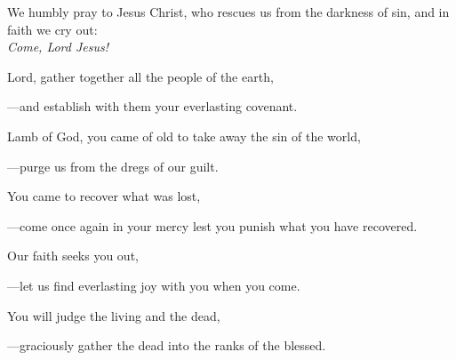 \intercessions\indent

\begin{hangpar}

We humbly pray to Jesus Christ, who rescues us from the darkness of sin, and in faith we cry out:\\
\emph{Come, Lord Jesus!}

\medskip Lord, gather together all the people of the earth,

{\color{red}---\thinspace}and establish with them your everlasting covenant.

\medskip Lamb of God, you came of old to take away the sin of the world,

{\color{red}---\thinspace}purge us from the dregs of our guilt.

\medskip You came to recover what was lost,

{\color{red}---\thinspace}come once again in your mercy lest you punish what you have recovered.

\medskip Our faith seeks you out,

{\color{red}---\thinspace}let us find everlasting joy with you when you come.

\medskip You will judge the living and the dead,

{\color{red}---\thinspace}graciously gather the dead into the ranks of the blessed.

\medskip

\end{hangpar}